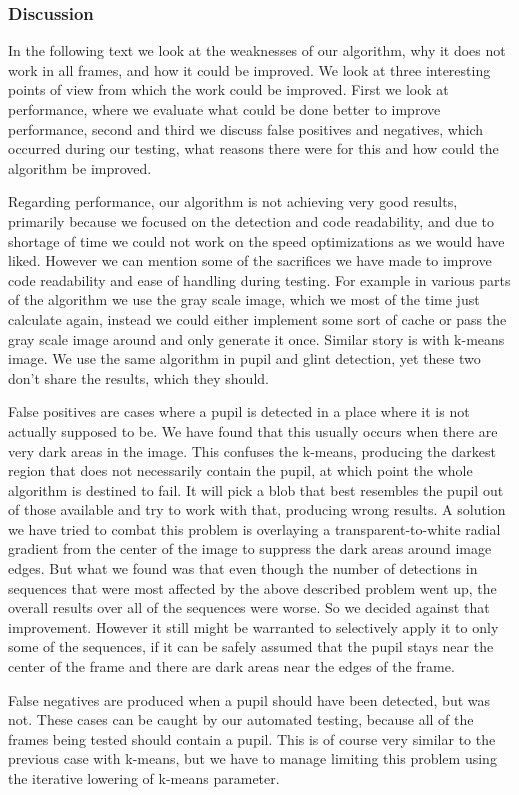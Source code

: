 \subsubsection{Discussion}
In the following text we look at the weaknesses of our algorithm, why it does not work in all frames, and how it could be improved. We look at three interesting points of view from which the work could be improved. First we look at performance, where we evaluate what could be done better to improve performance, second and third we discuss false positives and negatives, which occurred during our testing, what reasons there were for this and how could the algorithm be improved.

Regarding performance, our algorithm is not achieving very good results, primarily because we focused on the detection and code readability, and due to shortage of time we could not work on the speed optimizations as we would have liked. However we can mention some of the sacrifices we have made to improve code readability and ease of handling during testing. 
For example in various parts of the algorithm we use the gray scale image, which we most of the time just calculate again, instead we could either implement some sort of cache or pass the gray scale image around and only generate it once. Similar story is with k-means image. We use the same algorithm in pupil and glint detection, yet these two don’t share the results, which they should.

False positives are cases where a pupil is detected in a place where it is not actually supposed to be. We have found that this usually occurs when there are very dark areas in the image. This confuses the k-means, producing the darkest region that does not necessarily contain the pupil, at which point the whole algorithm is destined to fail. It will pick a blob that best resembles the pupil out of those available and try to work with that, producing wrong results. 
A solution we have tried to combat this problem is overlaying a transparent-to-white radial gradient from the center of the image to suppress the dark areas around image edges. But what we found was that even though the number of detections in sequences that were most affected by the above described problem went up, the overall results over all of the sequences were worse. So we decided against that improvement. However it still might be warranted to selectively apply it to only some of the sequences, if it can be safely assumed that the pupil stays near the center of the frame and there are dark areas near the edges of the frame.

False negatives are produced when a pupil should have been detected, but was not. These cases can be caught by our automated testing, because all of the frames being tested should contain a pupil. This is of course very similar to the previous case with k-means, but we have to manage limiting this problem using the iterative lowering of k-means parameter.

